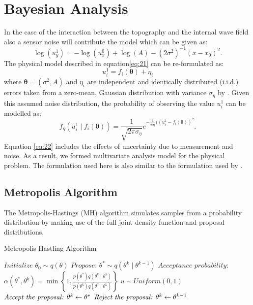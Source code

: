 \documentclass[12pt]{report}
\begin{document}
\section{Bayesian Analysis}

In the case of the interaction between the topography and the internal wave field also a sensor noise will contribute the model which can be given as:
\begin{equation}
\label{eq:21}
\log(u_{y}^{1})=-\log(u_{x}^{0})+\log(A)-(2\sigma^2)^{-1} (x-x_0)^2.
\end{equation}
The physical model described in equation\ref{eq:21} can be re-formulated as:
\begin{equation}
u_{i}^{1}=f_i(\mathbf{\theta})+\eta_i
\end{equation}
where $\mathbf{\theta}=(\sigma^2,A)$ and $\eta_i$ are independent and identically distributed
(i.i.d.) errors taken from a zero-mean, Gaussian distribution with variance $\sigma_{\eta}$ by \citet{Reed2015}. Given this assumed noise distribution, the probability of observing the value $u_{i}^{1}$ can be modelled as:
\begin{equation}
\label{eq:22}
f_{\eta}(u_{i}^{1}\mid f_i(\mathbf{\theta}))=\frac{1}{\sqrt{2\pi \sigma_{\eta}}}e^{-\frac{1}{2 \sigma_{\eta}^2}((u_{i}^{1}-f_i(\mathbf{\theta}))^2}.
\end{equation}
Equation \ref{eq:22} includes the effects of uncertainty due to measurement and noise. As a result, we formed multivariate analysis model for the physical problem. The formulation used here is also similar to the formulation used by \citet{Lin2017,Earls2013,Reed2015}. 
\subsection{Metropolis Algorithm}
The Metropolis-Hastings (MH) algorithm simulates samples from a probability distribution by making use of the full joint density function and proposal distributions.
\begin{algorithm}
\caption{Metropolis Hastling Algorithm}\label{MetroHastle}
\begin{algorithmic}[1]
\State $\textit{Initialize $\theta_0 \sim q(\theta)$}$
\State $\textit{Propose: $\theta^* \sim q(\theta^{k} \mid \theta^{k-1})$}$
\State $\textit{Acceptance probability:}$
\State $\textit{$\alpha(\theta^*,\theta^k)= \min\left \{ 1, \frac{p(\theta^*)q(\theta^k \mid \theta^k)}{p(\theta^k)q(\theta^* \mid \theta^k)}  \right \}$}$
\State $\textit{$u \sim Uniform(0,1)$}$
\State $\textit{Accept the proposal: $ \theta^{k} \leftarrow \theta^*$}$
  \Else
\State $\textit{Reject the proposal: $ \theta^{k} \leftarrow \theta^{k-1}$}$
  \EndIf
\EndFor

\EndProcedure
\end{algorithmic}
\end{algorithm}
\end{document}
